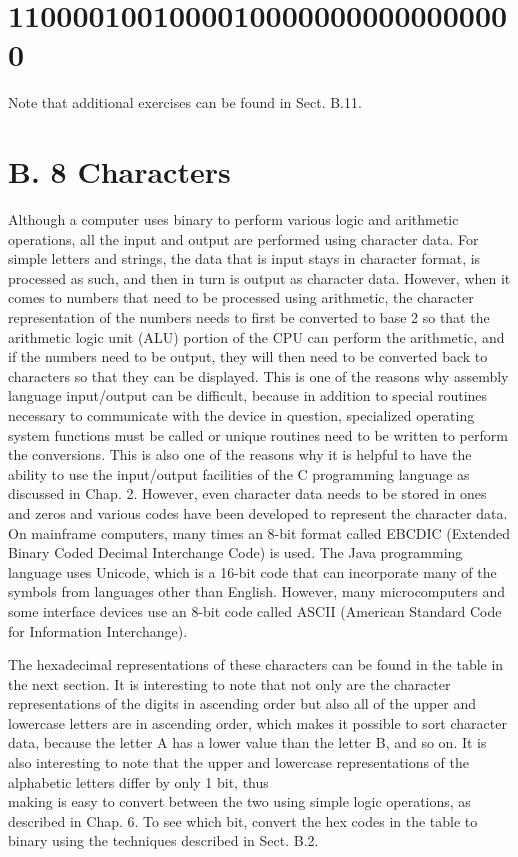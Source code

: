 \documentclass[10pt]{article}
\begin{document}
\section*{11000010010000100000000000000000}
Note that additional exercises can be found in Sect. B.11.

\section*{B. 8 Characters}
Although a computer uses binary to perform various logic and arithmetic operations, all the input and output are performed using character data. For simple letters and strings, the data that is input stays in character format, is processed as such, and then in turn is output as character data. However, when it comes to numbers that need to be processed using arithmetic, the character representation of the numbers needs to first be converted to base 2 so that the arithmetic logic unit (ALU) portion of the CPU can perform the arithmetic, and if the numbers need to be output, they will then need to be converted back to characters so that they can be displayed. This is one of the reasons why assembly language input/output can be difficult, because in addition to special routines necessary to communicate with the device in question, specialized operating system functions must be called or unique routines need to be written to perform the conversions. This is also one of the reasons why it is helpful to have the ability to use the input/output facilities of the C programming language as discussed in Chap. 2. However, even character data needs to be stored in ones and zeros and various codes have been developed to represent the character data. On mainframe computers, many times an 8-bit format called EBCDIC (Extended Binary Coded Decimal Interchange Code) is used. The Java programming language uses Unicode, which is a 16-bit code that can incorporate many of the symbols from languages other than English. However, many microcomputers and some interface devices use an 8-bit code called ASCII (American Standard Code for Information Interchange).

The hexadecimal representations of these characters can be found in the table in the next section. It is interesting to note that not only are the character representations of the digits in ascending order but also all of the upper and lowercase letters are in ascending order, which makes it possible to sort character data, because the letter A has a lower value than the letter B, and so on. It is also interesting to note that the upper and lowercase representations of the alphabetic letters differ by only 1 bit, thus\\
making is easy to convert between the two using simple logic operations, as described in Chap. 6. To see which bit, convert the hex codes in the table to binary using the techniques described in Sect. B.2.
\end{document}
